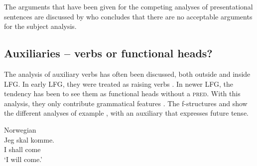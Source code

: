 \documentclass[output=paper,hidelinks]{langscibook}
\begin{document}
\noindent The arguments that have been given for the competing analyses of presentational sentences are discussed by \citet{Lodrup20} who concludes that there are no acceptable arguments for the subject analysis.

\subsection{Auxiliaries -- verbs or functional heads?}

The analysis of auxiliary verbs has often been discussed, both outside and inside LFG. In early LFG, they were treated as raising verbs \citep{Falk84}. In newer LFG, the tendency has been to see them as functional heads without a \textsc{pred}. With this analysis, they only contribute grammatical features \citep{butt-etal2004,FrankZaenen2004}. The f-structures  and  show the different analyses of example , with an auxiliary that expresses future tense.



\ea\label{ex:Scandinavian:55} Norwegian\\
\gll
 {Jeg} {skal} {komme.}\\
 I shall come \\
\glt `I will come.'
 \z




\end{document}
